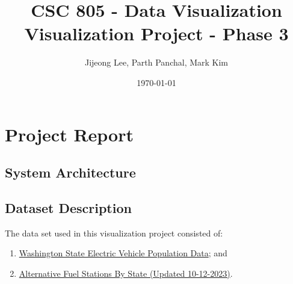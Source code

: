 \documentclass{article}
\title{CSC 805 - Data Visualization\\\large Visualization Project - Phase 3}
\author{Jijeong Lee, Parth Panchal, Mark Kim}
\date{\today}
\begin{document}
\clearpage\maketitle
\tableofcontents
\thispagestyle{empty}

\newpage
\section{Project Report}
\subsection{System Architecture}


\subsection{Dataset Description}
The data set used in this visualization project consisted of:
\begin{enumerate}
    \item
    \href{https://data.wa.gov/Transportation/Electric-Vehicle-Population-Data/f6w7-q2d2}{Washington
    State Electric Vehicle Population Data}; and
    \item \href{https://afdc.energy.gov/data_download}{Alternative Fuel Stations
    By State (Updated 10-12-2023)}.
\end{enumerate}
\end{document}
